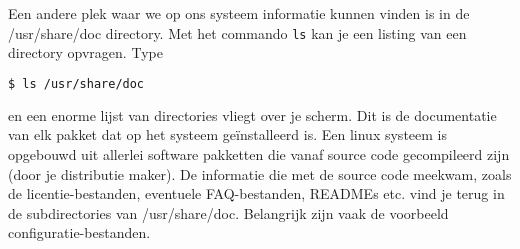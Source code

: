 Een andere plek waar we op ons systeem informatie kunnen vinden is in de /usr/share/doc directory. Met het commando \texttt{ls} kan je een listing van een directory opvragen. Type

\begin{lstlisting}[language=bash]
$ ls /usr/share/doc
\end{lstlisting}

en een enorme lijst van directories vliegt over je scherm. Dit is de documentatie van elk pakket dat op het systeem ge\"installeerd is. Een linux systeem is opgebouwd uit allerlei software pakketten die vanaf source code gecompileerd zijn (door je distributie maker). De informatie die met de source code meekwam, zoals de licentie-bestanden, eventuele FAQ-bestanden, READMEs etc. vind je terug in de subdirectories van /usr/share/doc. Belangrijk zijn vaak de voorbeeld configuratie-bestanden.

